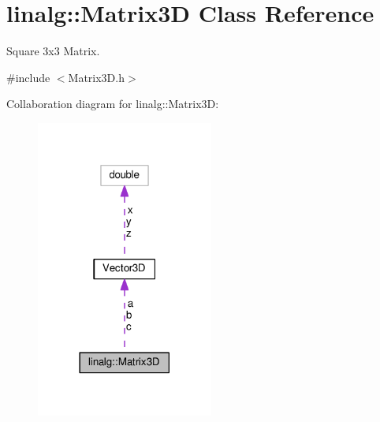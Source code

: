 \hypertarget{classlinalg_1_1Matrix3D}{}\section{linalg\+:\+:Matrix3D Class Reference}
\label{classlinalg_1_1Matrix3D}


Square 3x3 Matrix.  




{\ttfamily \#include $<$Matrix3\+D.\+h$>$}



Collaboration diagram for linalg\+:\+:Matrix3D\+:\nopagebreak
\begin{figure}[H]
\begin{center}
\leavevmode
\includegraphics[width=165pt]{classlinalg_1_1Matrix3D__coll__graph}
\end{center}
\end{figure}
